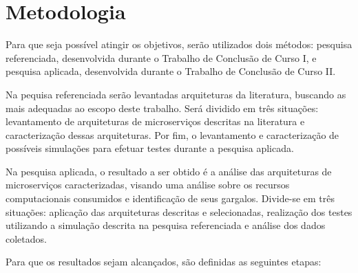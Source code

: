 \section{Metodologia}
\label{met}

Para que seja possível atingir os objetivos, serão utilizados dois métodos: pesquisa referenciada, desenvolvida durante o Trabalho de Conclusão de Curso I, e pesquisa aplicada, desenvolvida durante o Trabalho de Conclusão de Curso II.

Na pequisa referenciada serão levantadas arquiteturas da literatura, buscando as mais adequadas ao escopo deste trabalho. Será dividido em três situações: levantamento de arquiteturas de microserviços descritas na literatura e caracterização dessas arquiteturas. 
%
Por fim, o levantamento e caracterização de possíveis simulações para efetuar testes durante a pesquisa aplicada.

Na pesquisa aplicada, o resultado a ser obtido é a análise das arquiteturas de microserviços caracterizadas, visando uma análise sobre os recursos computacionais consumidos e identificação de seus gargalos. 
%
Divide-se em três situações: aplicação das arquiteturas descritas e selecionadas, realização dos testes utilizando a simulação descrita na pesquisa referenciada e análise dos dados coletados.

Para que os resultados sejam alcançados, são definidas as seguintes etapas:

